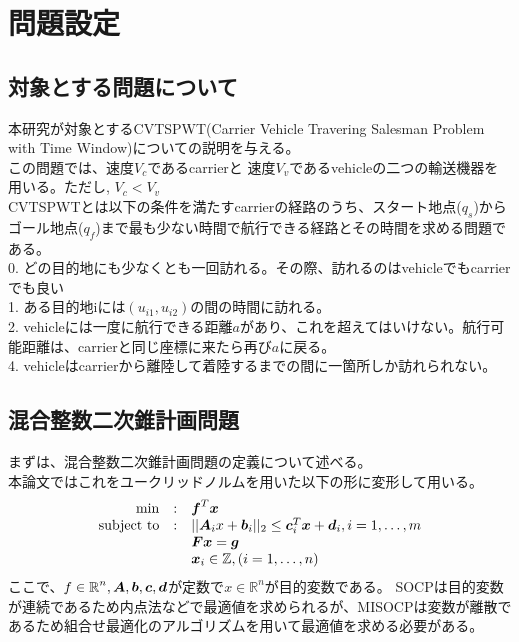 \documentclass[11pt,a4paper,dvipdfmx,titlepage,uplatex]{jsarticle}
\theoremstyle{mystyle}
\newcommand{\0}{\mathbf{0}}
\def\b{\mbox{\boldmath $b$}}
\def\c{\mbox{\boldmath $c$}}
\def\d{\mbox{\boldmath $d$}}
\def\f{\mbox{\boldmath $f$}}
\def\g{\mbox{\boldmath $g$}}
\def\x{\mbox{\boldmath $x$}}
\def\A{\mbox{\boldmath $A$}}
\def\F{\mbox{\boldmath $F$}}
\def\Real{\mbox{$\mathbb{R}$}}
\begin{document}
\section{問題設定}\label{sec:Second_Order_Cone_Programming_without_interiorpoint}
\subsection{対象とする問題について}\label{sec:problem_settings}
本研究が対象とするCVTSPWT(Carrier Vehicle Travering Salesman Problem with Time Window)についての説明を与える。\\
この問題では、速度$V_c$であるcarrierと 速度$V_v$であるvehicleの二つの輸送機器を用いる。ただし, $V_c< V_v$\\
CVTSPWTとは以下の条件を満たすcarrierの経路のうち、スタート地点($q_s$)からゴール地点($q_f$)まで最も少ない時間で航行できる経路とその時間を求める問題である。\\
0. どの目的地にも少なくとも一回訪れる。その際、訪れるのはvehicleでもcarrierでも良い\\
1. ある目的地iには$(u_{i1}, u_{i2})$の間の時間に訪れる。\\
2. vehicleには一度に航行できる距離$a$があり、これを超えてはいけない。航行可能距離は、carrierと同じ座標に来たら再び$a$に戻る。\\
4. vehicleはcarrierから離陸して着陸するまでの間に一箇所しか訪れられない。


\subsection{混合整数二次錐計画問題}\label{sec:Second_Order_Cone_Programming}

まずは、混合整数二次錐計画問題の定義について述べる。\\
本論文ではこれをユークリッドノルムを用いた以下の形に変形して用いる。
\begin{align}
	\begin{array}{rcl}
		\min & : & \f ^T\x \\
		\text{subject to} & : &||\A_i x +\b_i||_2 \leq \c_i^T\x+\d_i, i = 1,\dots, m \\
		& & \F\x=\g\\
		& & \x_i \in \mathbb{Z}, (i=1,\dots, n)
	\end{array}
\end{align}
ここで、$f \in \Real^n , \A, \b, \c, \d$が定数で$x \in \Real^n$が目的変数である。
SOCPは目的変数が連続であるため内点法などで最適値を求められるが、MISOCPは変数が離散であるため組合せ最適化のアルゴリズムを用いて最適値を求める必要がある。
\end{document}
